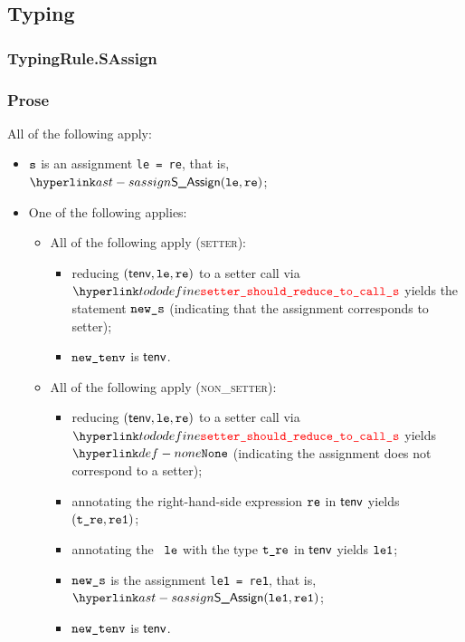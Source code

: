 \subsection{Typing}
\subsubsection{TypingRule.SAssign \label{sec:TypingRule.SAssign}}
\subsubsection{Prose}
All of the following apply:
\begin{itemize}
  \item $\texttt{s}$ is an assignment \texttt{le = re}, that is, $\SAssign(\vle, \vre)$;
  \item One of the following applies:
  \begin{itemize}
    \item All of the following apply (\textsc{setter}):
    \begin{itemize}
      \item reducing $(\textsf{tenv}, \texttt{le}, \texttt{re})$ to a setter call via \\ $\inlinesetter$ yields the statement $\texttt{new\_s}$
      (indicating that the assignment corresponds to setter)\ProseOrTypeError;
      \item $\texttt{new\_tenv}$ is $\textsf{tenv}$.
    \end{itemize}

    \item All of the following apply (\textsc{non\_setter}):
    \begin{itemize}
      \item reducing $(\textsf{tenv}, \texttt{le}, \texttt{re})$ to a setter call via \\ $\inlinesetter$ yields $\None$
            (indicating the assignment does not correspond to a setter);
      \item annotating the right-hand-side expression $\texttt{re}$ in $\textsf{tenv}$ yields $(\texttt{t\_re}, \texttt{re1})$\ProseOrTypeError;
      \item annotating the \assignableexpression\ $\texttt{le}$ with the type $\texttt{t\_re}$ in $\textsf{tenv}$ yields $\texttt{le1}$\ProseOrTypeError;
      \item $\texttt{new\_s}$ is the assignment \texttt{le1 = re1}, that is, $\SAssign(\vleone, \vreone)$;
      \item $\texttt{new\_tenv}$ is $\textsf{tenv}$.
    \end{itemize}

  \end{itemize}
\end{itemize}
